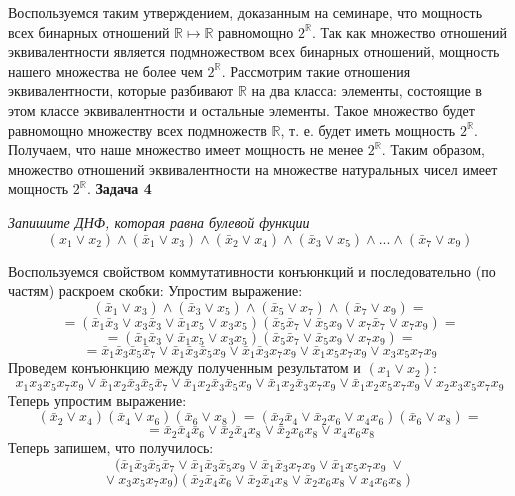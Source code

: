 \documentclass{article}
\begin{document}
Воспользуемся таким утверждением, доказанным на семинаре, что мощность всех бинарных отношений $\mathbb{R}\mapsto \mathbb{R}$ равномощно $2^{\mathbb{R}}$. Так как множество отношений эквивалентности является подмножеством всех бинарных отношений, мощность нашего множества не более чем $2^{\mathbb{R}}$. Рассмотрим такие отношения эквивалентности, которые разбивают $\mathbb{R}$ на два класса: элементы, состоящие в этом классе эквивалентности и остальные элементы. Такое множество будет равномощно множеству всех подмножеств $\mathbb{R}$, т. е. будет иметь мощность $2^{\mathbb{R}}$. Получаем, что наше множество имеет мощность не менее $2^{\mathbb{R}}$. Таким образом, множество отношений эквивалентности на множестве натуральных чисел имеет мощность $2^{\mathbb{R}}$.
\newline
\newline
 \noindent \textbf{Задача 4}
\begin{center}
\textit{Запишите ДНФ, которая равна булевой функции
$$(x_1 \vee x_2)\wedge(\bar{x}_1 \vee x_3)\wedge(\bar{x}_2 \vee x_4)\wedge(\bar{x}_3 \vee x_5)\wedge...\wedge(\bar{x}_7 \vee x_9)$$}
\end{center}
Воспользуемся свойством коммутативности конъюнкций и последовательно (по частям) раскроем скобки:
Упростим выражение:
$$(\bar{x}_1 \vee x_3)\wedge(\bar{x}_3 \vee x_5)\wedge(\bar{x}_5\vee x_7)\wedge(\bar{x}_7\vee x_9)=$$
$$=(\bar{x}_1\bar{x}_3\vee x_3\bar{x}_3 \vee \bar{x}_1x_5 \vee x_3 x_5)(\bar{x}_5 \bar{x}_7 \vee \bar{x}_5 x_9 \vee x_7 \bar{x}_7 \vee x_7 x_9)=$$
$$=(\bar{x}_1\bar{x}_3\vee  \bar{x}_1x_5 \vee x_3 x_5)(\bar{x}_5 \bar{x}_7 \vee \bar{x}_5 x_9  \vee x_7 x_9)=$$
$$=\bar{x}_1 \bar{x}_3 \bar{x}_5 \bar{x}_7 \vee \bar{x}_1 \bar{x}_3 \bar{x}_5 x_9 \vee\bar{x}_1 \bar{x}_3x_7 x_9 \vee \bar{x}_1 x_5 x_7 x_9 \vee x_3 x_5 x_7 x_9$$
Проведем конъюнкцию между полученным результатом и $(x_1 \vee x_2)$:
$$x_1 x_3 x_5 x_7 x_9 \vee \bar{x}_1 x_2 \bar{x}_3 \bar{x}_5 \bar{x}_7 \vee \bar{x}_1 x_2 \bar{x}_3 \bar{x}_5 x_9 \vee\bar{x}_1 x_2 \bar{x}_3x_7 x_9 \vee \bar{x}_1 x_2 x_5 x_7 x_9 \vee x_2 x_3 x_5 x_7 x_9$$
Теперь упростим выражение: 
$$(\bar{x}_2 \vee x_4)(\bar{x}_4 \vee x_6)(\bar{x}_6 \vee x_8)=(\bar{x}_2 \bar{x}_4 \vee \bar{x}_2 x_6 \vee x_4 x_6)(\bar{x}_6\vee x_8)=$$
$$=\bar{x}_2 \bar{x}_4 \bar{x}_6 \vee \bar{x}_2 \bar{x}_4 x_8 \vee \bar{x}_2 x_6 x_8 \vee x _4 x_6 x_8$$
Теперь запишем, что получилось:
$$(\bar{x}_1 \bar{x}_3 \bar{x}_5 \bar{x}_7 \vee \bar{x}_1 \bar{x}_3 \bar{x}_5 x_9 \vee\bar{x}_1 \bar{x}_3x_7 x_9 \vee \bar{x}_1 x_5 x_7 x_9 ~ \vee$$
$$\vee ~ x_3 x_5 x_7 x_9)(\bar{x}_2 \bar{x}_4 \bar{x}_6 \vee \bar{x}_2 \bar{x}_4 x_8 \vee \bar{x}_2 x_6 x_8 \vee x _4 x_6 x_8)$$
\end{document}
